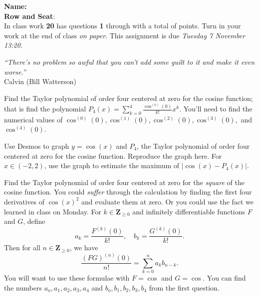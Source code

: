 \documentclass[12pt,fleqn]{exam}
\newcommand{\integers}{\mathbf{Z}}
\newcommand{\quiz}{20}
\newcommand{\due}{Tuesday 7 November 13:20}
\newcommand{\class}{MATH 202, Fall \the\year}
\begin{document}
\large
\noindent\makebox[3.0truein][l]{\textbf{\class}}
\textbf{Name:} \hrulefill \\
\noindent \makebox[3.0truein][l]{\textbf{In class work  \quiz}}
\textbf{Row and Seat}:\hrulefill\\



\noindent  In class work  \textbf{\quiz}  has questions \textbf{1} 
through  \textbf{\numquestions} \/ with a total of 
\textbf{\numpoints\/} points. Turn in your work at the end of class 
\emph{on paper}. This assignment is due \emph{\due}.

\vspace{0.1in}
\noindent \emph{“There’s no problem so awful that you can’t add some guilt to it and make it even worse.”} \\ \phantom{xxx} \hfill {\sc Calvin (Bill Watterson)}


\begin{questions} 

\question[2] Find the Taylor polynomial of order four centered at zero for the cosine function; that is find the polynomial
$\displaystyle
   P_4(x) = \sum_{k=0}^4 \frac{\cos^{(k)}(0)}{k!} x^k.
$
You'll need to find the numerical values of $\cos^{(0)}(0), \cos^{(1)}(0),  \cos^{(2)}(0),  \cos^{(3)}(0),$ and $ \cos^{(4)}(0)$.
\begin{solution}[3.5in]

\end{solution}

\question[2] Use Desmos to graph $y = \cos(x)$ and $P_4$, the Taylor polynomial of order four centered at zero for the cosine function.
Reproduce the graph here.  For $x \in (-2,2)$, use the graph to estimate the maximum of $| \cos(x) - P_4(x)|$.

\begin{solution}%

\end{solution}

\newpage

\question[2] Find the Taylor polynomial of order four centered at zero for the \emph{square} of the cosine function.  You could \emph{suffer}
through the calculation by finding the first four derivatives of $\cos(x)^2$ and evaluate them at zero. Or you could use the fact we learned
in class on Monday.  For $k \in \integers_{\geq 0}$ and infinitely differentiable functions $F$ and $G$, define
\begin{equation*}
   a_k = \frac{F^{(k)}(0)}{k!}, \quad 
   b_k = \frac{G^{(k)}(0)}{k!}.
\end{equation*}
Then for all $n \in \integers_{\geq 0}$, we have
\begin{equation*}
   \frac{ \left(F G\right)^{(n)}(0)}{n!} = \sum_{k=0}^n  a_k b_{n-k}.
\end{equation*}
You will want to use these formulae with $F = \cos$ and $G = \cos$.  You can find the numbers $a_o, a_1, a_2, a_3, a_4$ 
and $b_o, b_1, b_2, b_3, b_4$ from the 
first question. 




\end{questions}
\end{document}
